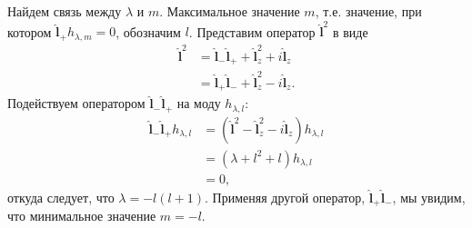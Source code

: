 \documentclass[12pt,a4paper]{article}
\newcommand{\V}[1]{\mathbf{#1}}
\newcommand{\Op}[1]{\hat{\V{#1}}}
\begin{document}
        Найдем связь между $\lambda$ и $m$. Максимальное значение $m$, т.е. значение, при котором $\Op{l}_{+} h_{\lambda,m} = 0$, обозначим $l$. Представим оператор $\Op{l}^2$ в виде
        \begin{equation}\begin{aligned}
            \Op{l}^2
                &= \Op{l}_{-}\Op{l}_{+} + \Op{l}^2_{z} + i \Op{l}_{z} \\
                &= \Op{l}_{+}\Op{l}_{-} + \Op{l}^2_{z} - i \Op{l}_{z} .
        \end{aligned}\end{equation}
        Подействуем оператором $\Op{l}_{-}\Op{l}_{+}$ на моду $h_{\lambda,l}$:
        \begin{equation}\begin{aligned}
            \Op{l}_{-}\Op{l}_{+} h_{\lambda,l}
                &= (\Op{l}^2 - \Op{l}^2_{z} - i \Op{l}_{z}) h_{\lambda,l} \\
                &= (\lambda + l^2 + l) h_{\lambda,l} \\
                &= 0 ,
        \end{aligned}\end{equation}
        откуда следует, что $\lambda = - l (l + 1)$. Применяя другой оператор, $\Op{l}_{+}\Op{l}_{-}$, мы увидим, что минимальное значение $m = - l$.


    \nocite{*}
    
    
\end{document}
